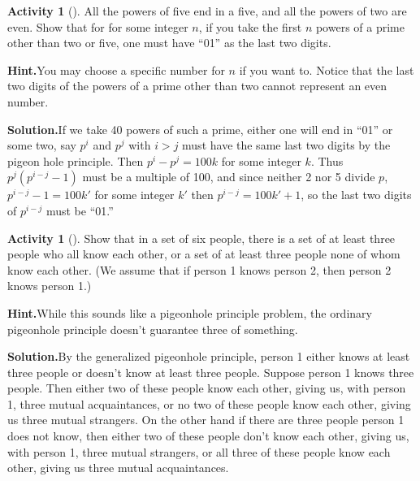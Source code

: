 \documentclass[10pt,]{book}
\theoremstyle{plain}
\theoremstyle{definition}
\newtheorem{activity}[project]{Activity}
\numberwithin{equation}{chapter}
\begin{document}
\begin{activity}[]\label{activity-64}
All the powers of five end in a five, and all the powers of two are even. Show that for for some integer \(n\), if you take the first \(n\) powers of a prime other than two or five, one must have ``01'' as the last two digits.%
\par\medskip\noindent%
\textbf{Hint.}\quad You may choose a specific number for \(n\) if you want to. Notice that the last two digits of the powers of a prime other than two cannot represent an even number.%
\par\medskip\noindent%
\textbf{Solution.}\quad If we take 40 powers of such a prime, either one will end in ``01'' or some two, say \(p^i\) and \(p^j\) with \(i>j\) must have the same last two digits by the pigeon hole principle. Then \(p^i-p^j=100k\) for some integer \(k\). Thus \(p^j(p^{i-j} -1)\) must be a multiple of 100, and since neither 2 nor 5 divide \(p\), \(p^{i-j} -1 = 100k'\) for some integer \(k'\) then \(p^{i-j} = 100k'+1\), so the last two digits of \(p^{i-j}\) must be ``01.''%
\end{activity}
\begin{activity}[]\label{R_3_3_}
Show that in a set of six people, there is a set of at least three people who all know each other, or a set of at least three people none of whom know each other. (We assume that if person 1 knows person 2, then person 2 knows person 1.)%
\par\medskip\noindent%
\textbf{Hint.}\quad While this sounds like a pigeonhole principle problem, the ordinary pigeonhole principle doesn’t guarantee three of something.%
\par\medskip\noindent%
\textbf{Solution.}\quad By the generalized pigeonhole principle, person 1 either knows at least three people or doesn't know at least three people. Suppose person 1 knows three people. Then either two of these people know each other, giving us, with person 1, three mutual acquaintances, or no two of these people know each other, giving us three mutual strangers. On the other hand if there are three people person 1 does not know, then either two of these people don't know each other, giving us, with person 1, three mutual strangers, or all three of these people know each other, giving us three mutual acquaintances.%
\end{activity}
\end{document}
